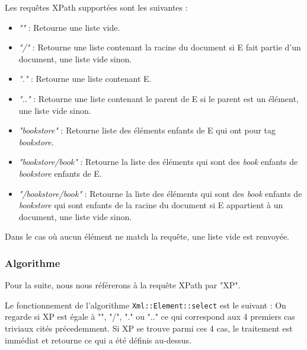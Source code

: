     Les requêtes XPath supportées sont les suivantes :
    \begin{itemize}
        \item \textit{""} : Retourne une liste vide.
        \item \textit{"/"} : Retourne une liste contenant la racine du document si E fait partie d'un document, une liste vide sinon.
        \item \textit{"."} : Retourne une liste contenant E.
        \item \textit{".."} : Retourne une liste contenant le parent de E si le parent est un élément, une liste vide sinon.
        \item \textit{"bookstore"} : Retourne liste des éléments enfants de E qui ont pour tag \textit{bookstore}.
        \item \textit{"bookstore/book"} : Retourne la liste des éléments qui sont des \textit{book} enfants de \textit{bookstore} enfants de E.
        \item \textit{"/bookstore/book"} : Retourne la liste des éléments qui sont des \textit{book} enfants de \textit{bookstore} qui sont enfants de la racine du document si E appartient à un document, une liste vide sinon.
        \\
    \end{itemize}

    Dans le cas où aucun élément ne match la requête, une liste vide est renvoyée.

    \subsubsection{Algorithme}

    Pour la suite, nous nous référerons à la requête XPath par "XP".

    Le fonctionnement de l'algorithme \lstinline$Xml::Element::select$ est le suivant :
    On regarde si XP est égale à "", "/", "." ou ".." ce qui correspond aux 4 premiers cas triviaux cités précedemment.
    Si XP se trouve parmi ces 4 cas, le traitement est immédiat et retourne ce qui a été définis au-dessus.

